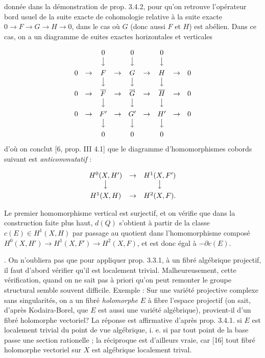 
donnée dans la démonstration de prop. 3.4.2, pour qu'on retrouve l'opérateur
bord usuel de la suite exacte de cohomologie relative à la suite exacte
$0\to F\to G\to H\to0$, dans
le cas où $G$ (donc aussi $F$ et $H$) est abélien. Dans ce cas, on a un
diagramme de suites exactes horizontales et verticales

\[
\begin{array}{ccccccccc}
&&0&&0&&0&&\\
&&\big\downarrow&&\big\downarrow&&\big\downarrow&&\\[0.45em]
0&\to&F&\to&G&\to&H&\to&0\\
&&\big\downarrow&&\big\downarrow&&\big\downarrow&&\\[0.45em]
0&\to&\overline F&\to&\overline G&\to&\overline H&\to&0\\
&&\big\downarrow&&\big\downarrow&&\big\downarrow&&\\[0.45em]
0&\to&F'&\to&G'&\to&H'&\to&0\\
&&\big\downarrow&&\big\downarrow&&\big\downarrow&&\\[0.45em]
&&0&&0&&0&&
\end{array}
\]
d'où on conclut [6, prop. III 4.1] que le diagramme d'homomorphismes cobords
suivant est \textit{anticommutatif} :

\[
\begin{array}{ccc}
H^0(X,H')&\to&H^1(X,F')\\
\big\downarrow&&\big\downarrow\\[0.45em]
H^1(X,H)&\to&H^2(X,F).
\end{array}
\]

Le premier homomorphisme vertical est surjectif, et on vérifie que dans la
construction faite plus haut, $d(Q)$ s'obtient à partir de la classe
$c(E)\in H^1(X,H)$ par passage au quotient dans l'homomorphisme composé
$H^0(X,H')\to H^1(X,F')\to H^2(X,F)$,
et est donc égal à $-\partial c(E)$.

. On n'oubliera pas que pour appliquer prop. 3.3.1, à un fibré algébrique
projectif, il faut d'abord vérifier qu'il est localement trivial.
Malheureusement, cette vérification, quand on ne sait pas à priori qu'on peut
remonter le groupe structural semble souvent difficile.
Exemple : Sur une variété projective complexe sans singularités, on a un fibré
\textit{holomorphe} $E$ à fibre l'espace projectif (on sait, d'après
Kodaira-Borel, que $E$ est aussi une variété algébrique), provient-il d'un
fibré holomorphe vectoriel? La réponse est affirmative d'après prop. 3.4.1. si
$E$ est localement trivial du point de vue algébrique, i. e. si par tout point
de la base passe une section rationelle ; la réciproque est d'ailleurs vraie,
car [16] tout fibré holomorphe vectoriel sur $X$ est algébrique localement
trival.

